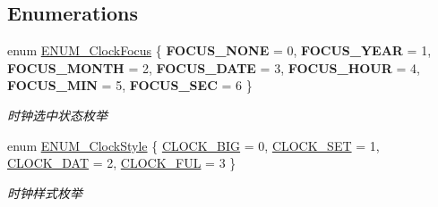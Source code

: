 \subsection*{\-Enumerations}
\begin{DoxyCompactItemize}
\item 
enum \hyperlink{group___w_i_d_g_e_t_gad259d67a883a17bd30a95355be423d9f}{\-E\-N\-U\-M\-\_\-\-Clock\-Focus} \{ \*
{\bfseries \-F\-O\-C\-U\-S\-\_\-\-N\-O\-N\-E} =  0, 
{\bfseries \-F\-O\-C\-U\-S\-\_\-\-Y\-E\-A\-R} =  1, 
{\bfseries \-F\-O\-C\-U\-S\-\_\-\-M\-O\-N\-T\-H} =  2, 
{\bfseries \-F\-O\-C\-U\-S\-\_\-\-D\-A\-T\-E} =  3, 
\*
{\bfseries \-F\-O\-C\-U\-S\-\_\-\-H\-O\-U\-R} =  4, 
{\bfseries \-F\-O\-C\-U\-S\-\_\-\-M\-I\-N} =  5, 
{\bfseries \-F\-O\-C\-U\-S\-\_\-\-S\-E\-C} =  6
 \}
\begin{DoxyCompactList}\small\item\em 时钟选中状态枚举 \end{DoxyCompactList}\item 
enum \hyperlink{group___w_i_d_g_e_t_ga096d65323cbe1c9a55ddf6566972e0c7}{\-E\-N\-U\-M\-\_\-\-Clock\-Style} \{ \hyperlink{group___w_i_d_g_e_t_gga096d65323cbe1c9a55ddf6566972e0c7a2d2463feb28f4ce93e9dda0fcbab5203}{\-C\-L\-O\-C\-K\-\_\-\-B\-I\-G} =  0, 
\hyperlink{group___w_i_d_g_e_t_gga096d65323cbe1c9a55ddf6566972e0c7a8d2d7a3fb2433c570b55db4aa58288e1}{\-C\-L\-O\-C\-K\-\_\-\-S\-E\-T} =  1, 
\hyperlink{group___w_i_d_g_e_t_gga096d65323cbe1c9a55ddf6566972e0c7af2b0a3c4435e1f0c2a5cf42018332bc1}{\-C\-L\-O\-C\-K\-\_\-\-D\-A\-T} =  2, 
\hyperlink{group___w_i_d_g_e_t_gga096d65323cbe1c9a55ddf6566972e0c7a8b4cc99c547338a78acc1f4056d60c7e}{\-C\-L\-O\-C\-K\-\_\-\-F\-U\-L} =  3
 \}
\begin{DoxyCompactList}\small\item\em 时钟样式枚举 \end{DoxyCompactList}\end{DoxyCompactItemize}
